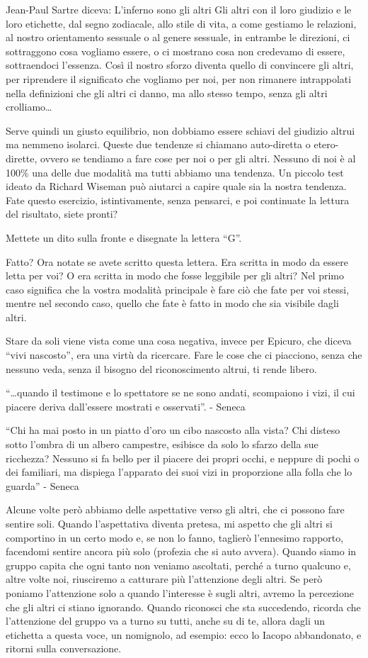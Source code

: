 \documentclass[12pt]{book} %
\begin{document}
Jean-Paul Sartre diceva: L'inferno sono gli altri
Gli altri con il loro giudizio e le loro etichette, dal segno zodiacale, allo stile di vita, a come gestiamo le relazioni, al nostro orientamento sessuale o al genere sessuale, in entrambe le direzioni, ci sottraggono cosa vogliamo essere, o ci mostrano cosa non credevamo di essere, sottraendoci l'essenza. Così il nostro sforzo diventa quello di convincere gli altri, per riprendere il significato che vogliamo per noi, per non rimanere intrappolati nella definizioni che gli altri ci danno, ma allo stesso tempo, senza gli altri crolliamo…

Serve quindi un giusto equilibrio, non dobbiamo essere schiavi del giudizio altrui ma nemmeno isolarci. Queste due
tendenze si chiamano auto-diretta o etero-dirette, ovvero se tendiamo a fare cose per noi o per gli altri. Nessuno di
noi è al 100\% una delle due modalità ma tutti abbiamo una tendenza. Un piccolo test ideato da Richard Wiseman può
aiutarci a capire quale sia la nostra tendenza. Fate questo esercizio, istintivamente, senza pensarci, e poi continuate
la lettura del risultato, siete pronti?

Mettete un dito sulla fronte e disegnate la lettera “G”.

Fatto? Ora notate se avete scritto questa lettera. Era scritta in modo da essere letta per voi? O era scritta in modo che
fosse leggibile per gli altri? Nel primo caso significa che la vostra modalità principale è fare ciò che fate per voi
stessi, mentre nel secondo caso, quello che fate è fatto in modo che sia visibile dagli altri.

Stare da soli viene vista come una cosa negativa, invece per Epicuro, che diceva “vivi nascosto”, era una virtù da
ricercare. Fare le cose che ci piacciono, senza che nessuno veda, senza il bisogno del riconoscimento altrui, ti rende
libero.

“…quando il testimone e lo spettatore se ne sono andati, scompaiono i vizi, il cui piacere deriva dall’essere mostrati e osservati”. - Seneca

“Chi ha mai posto in un piatto d’oro un cibo nascosto alla vista? Chi disteso sotto l’ombra di un albero campestre, esibisce da solo lo sfarzo della sue ricchezza? Nessuno si fa bello per il piacere dei propri occhi, e neppure di pochi o dei familiari, ma dispiega l’apparato dei suoi vizi in proporzione alla folla che lo guarda” - Seneca

Alcune volte però abbiamo delle aspettative verso gli altri, che ci possono fare sentire soli. Quando
l'aspettativa diventa pretesa, mi aspetto che gli altri si comportino in un certo modo e, se non
lo fanno, taglierò l'ennesimo rapporto, facendomi sentire ancora più solo (profezia che si auto avvera). Quando siamo
in gruppo capita che ogni tanto non veniamo ascoltati, perché a turno qualcuno e, altre volte noi, riusciremo a
catturare più l'attenzione degli altri. Se però poniamo l'attenzione solo a
quando l'interesse è sugli altri, avremo la percezione che gli altri ci stiano ignorando. Quando
riconosci che sta succedendo, ricorda che l'attenzione del gruppo va a turno su tutti, anche su di
te, allora dagli un etichetta a questa voce, un nomignolo, ad esempio: ecco lo Iacopo abbandonato, e ritorni sulla
conversazione.
\end{document}

